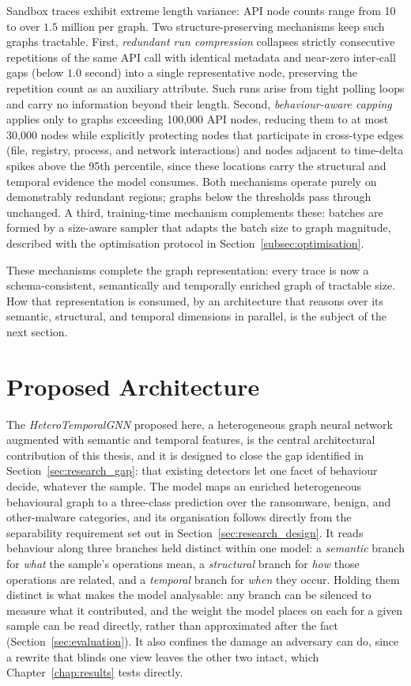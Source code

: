 \documentclass[%
    BCOR=10mm,
    DIV=13,
    toc=bibliography,
    toc=listof,
    oneside,
    12pt,
]{scrbook}
\begin{document}
Sandbox traces exhibit extreme length variance: API node counts range from 10
to over $1.5$ million per graph. Two structure-preserving mechanisms keep such
graphs tractable. First, \emph{redundant run compression} collapses strictly
consecutive repetitions of the same API call with identical metadata and
near-zero inter-call gaps (below $1.0$ second) into a single representative
node, preserving the repetition count as an auxiliary attribute. Such runs
arise from tight polling loops and carry no information beyond their length.
Second, \emph{behaviour-aware capping} applies only to graphs exceeding
100{,}000 API nodes, reducing them to at most 30{,}000 nodes while explicitly
protecting nodes that participate in cross-type edges (file, registry,
process, and network interactions) and nodes adjacent to time-delta spikes
above the 95th percentile, since these locations carry the structural and
temporal evidence the model consumes. Both mechanisms operate purely on
demonstrably redundant regions; graphs below the thresholds pass through
unchanged. A third, training-time mechanism complements these: batches are
formed by a size-aware sampler that adapts the batch size to graph magnitude,
described with the optimisation protocol in
Section~\ref{subsec:optimisation}.

These mechanisms complete the graph representation: every trace is now a
schema-consistent, semantically and temporally enriched graph of tractable size.
How that representation is consumed, by an architecture that reasons over its
semantic, structural, and temporal dimensions in parallel, is the subject of the
next section.

\section{Proposed Architecture}
\label{sec:architecture}

The \emph{HeteroTemporalGNN} proposed here, a heterogeneous graph neural network
augmented with semantic and temporal features, is the central architectural
contribution of this thesis, and it is designed to close the gap identified in
Section~\ref{sec:research_gap}: that existing detectors let one facet of
behaviour decide, whatever the sample. The model maps an enriched
heterogeneous behavioural graph to a three-class prediction over
the ransomware, benign, and other-malware categories, and its organisation
follows directly from the separability requirement set out in
Section~\ref{sec:research_design}. It reads behaviour along three branches
held distinct within one model: a \emph{semantic} branch for \emph{what} the
sample's operations mean, a \emph{structural} branch for \emph{how} those
operations are related, and a \emph{temporal} branch for \emph{when} they
occur. Holding them distinct is what makes the model analysable: any branch can
be silenced to measure what it contributed, and the weight the model places on
each for a given sample can be read directly, rather than approximated after
the fact (Section~\ref{sec:evaluation}). It also confines the damage an
adversary can do, since a rewrite that blinds one view leaves the other two
intact, which Chapter~\ref{chap:results} tests directly.
\end{document}
